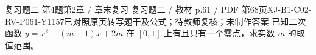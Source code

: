 \par\noindent\begin{minipage}{\linewidth}
\begin{bankitem}{复习题二 第4题}{第2章 / 章末复习 复习题二 / 教材 p.61 / PDF 第68页}{XJ-B1-C02-RV-P061-Y1157}{已对照原页转写题干及公式；待教师复核；未制作答案}
已知二次函数 $y=x^2-(m-1)x+2m$ 在 $[0,1]$ 上有且只有一个零点，求实数 $m$ 的取值范围。
\end{bankitem}
\end{minipage}\par\medskip

